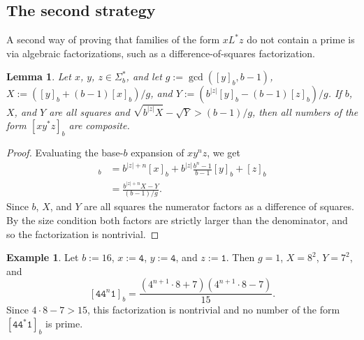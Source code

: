 \documentclass[12pt]{article}
\theoremstyle{plain}
\newtheorem{lemma}[theorem]{Lemma}
\theoremstyle{definition}
\newtheorem{example}[theorem]{Example}
\theoremstyle{remark}
\newcommand{\0}{\mathtt{0}}
\newcommand{\1}{\mathtt{1}}
\newcommand{\2}{\mathtt{2}}
\newcommand{\3}{\mathtt{3}}
\newcommand{\4}{\mathtt{4}}
\newcommand{\5}{\mathtt{5}}
\newcommand{\6}{\mathtt{6}}
\newcommand{\7}{\mathtt{7}}
\newcommand{\8}{\mathtt{8}}
\newcommand{\9}{\mathtt{9}}
\begin{document}
\subsection{The second strategy}

A second way of proving that families of the form $xL^*z$ do not contain a 
prime is via algebraic factorizations, such as a difference-of-squares 
factorization.

\begin{lemma}\label{lemsquares}
Let $x$, $y$, $z\in\Sigma^*_b$, and let $g:=\gcd([y]_b,b-1)$, 
$X:=([y]_b+(b-1)[x]_b)/g$, and $Y:=(b^{\lvert{z}\rvert}[y]_b-(b-1)[z]_b)/g$.
If\/ $b$, $X$, and $Y$ are all squares and 
$\sqrt{b^{\lvert z\rvert}X}-\sqrt{Y}>(b-1)/g$, then all numbers of the form
 $[xy^*z]_b$ are composite.
\end{lemma}
\begin{proof}
Evaluating the base-$b$ expansion of $xy^nz$, we get
\begin{align*}
[xy^nz]_b &= b^{\lvert z\rvert+n}[x]_b + b^{\lvert z\rvert}\frac{b^n-1}{b-1}[y]_b + [z]_b \\
&= \frac{b^{\lvert z\rvert+n}X-Y}{(b-1)/g} . 
\end{align*}
Since $b$, $X$, and $Y$ are all squares the numerator factors as a 
difference of squares.  By the size condition both factors are 
strictly larger than the
denominator, and so the factorization is nontrivial.
\end{proof}

\begin{example}
Let $b:=16$, $x:=\4$, $y:=\4$, and $z:=\1$.  Then $g=1$, $X=8^2$, $Y=7^2$, and
\[ [\4\4^n\1]_b = \frac{(4^{n+1}\cdot8+7)(4^{n+1}\cdot8-7)}{15} . \]
Since $4\cdot8-7>15$, this factorization is nontrivial and no number of 
the form $[\4\4^*\1]_b$ is prime.
\end{example}
\end{document}
